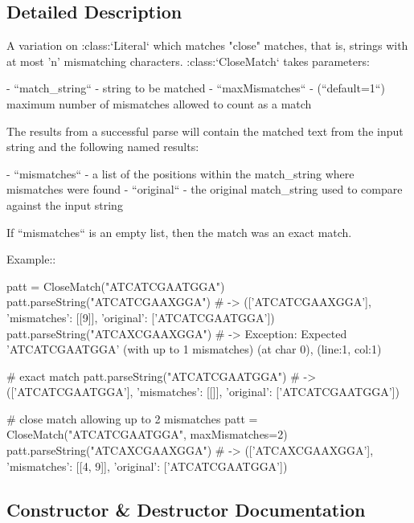 \subsection{Detailed Description}
\begin{DoxyVerb}A variation on :class:`Literal` which matches "close" matches,
that is, strings with at most 'n' mismatching characters.
:class:`CloseMatch` takes parameters:

 - ``match_string`` - string to be matched
 - ``maxMismatches`` - (``default=1``) maximum number of
   mismatches allowed to count as a match

The results from a successful parse will contain the matched text
from the input string and the following named results:

 - ``mismatches`` - a list of the positions within the
   match_string where mismatches were found
 - ``original`` - the original match_string used to compare
   against the input string

If ``mismatches`` is an empty list, then the match was an exact
match.

Example::

    patt = CloseMatch("ATCATCGAATGGA")
    patt.parseString("ATCATCGAAXGGA") # -> (['ATCATCGAAXGGA'], {'mismatches': [[9]], 'original': ['ATCATCGAATGGA']})
    patt.parseString("ATCAXCGAAXGGA") # -> Exception: Expected 'ATCATCGAATGGA' (with up to 1 mismatches) (at char 0), (line:1, col:1)

    # exact match
    patt.parseString("ATCATCGAATGGA") # -> (['ATCATCGAATGGA'], {'mismatches': [[]], 'original': ['ATCATCGAATGGA']})

    # close match allowing up to 2 mismatches
    patt = CloseMatch("ATCATCGAATGGA", maxMismatches=2)
    patt.parseString("ATCAXCGAAXGGA") # -> (['ATCAXCGAAXGGA'], {'mismatches': [[4, 9]], 'original': ['ATCATCGAATGGA']})
\end{DoxyVerb}
 

\subsection{Constructor \& Destructor Documentation}
\mbox{\label{classpyparsing_1_1CloseMatch_a1a8d2cf1dc66f298281e9702de4c78b3}} 
